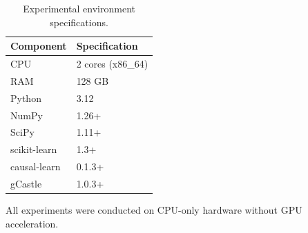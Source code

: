 \documentclass{article}
\begin{document}
\begin{table}[h]
\caption{Experimental environment specifications.}
\label{tab:environment}
\centering
\begin{tabular}{ll}
\toprule
Component & Specification \\
\midrule
CPU & 2 cores (x86\_64) \\
RAM & 128 GB \\
Python & 3.12 \\
NumPy & 1.26+ \\
SciPy & 1.11+ \\
scikit-learn & 1.3+ \\
causal-learn & 0.1.3+ \\
gCastle & 1.0.3+ \\
\bottomrule
\end{tabular}
\end{table}

All experiments were conducted on CPU-only hardware without GPU acceleration.
\end{document}
